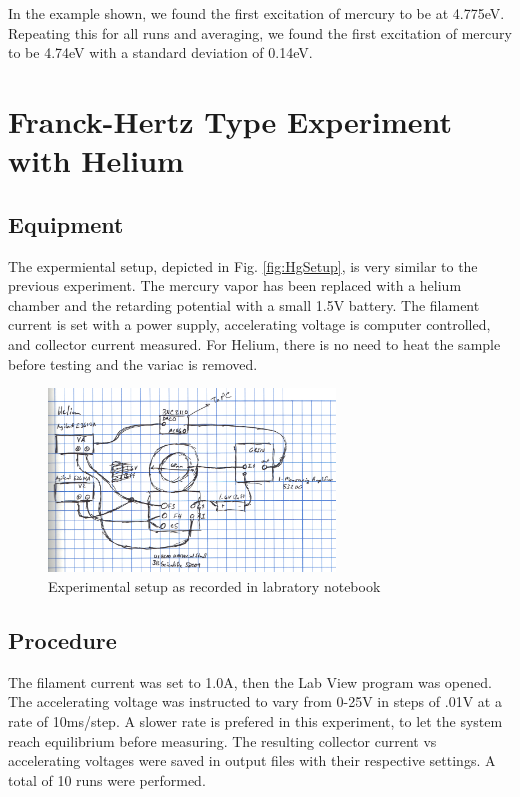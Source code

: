\documentclass[12pt,twocolumn]{article}
\begin{document}
In the example shown, we found the first excitation of mercury to be at 4.775eV. Repeating this for all runs and averaging, we found the first excitation of mercury to be 4.74eV with a standard deviation of 0.14eV.


\section{Franck-Hertz Type Experiment with Helium}

\subsection{Equipment}


The expermiental setup, depicted in Fig. \ref{fig:HgSetup}, is very similar to the previous experiment. The mercury vapor has been replaced with a helium chamber and the retarding potential with a small 1.5V battery. The filament current is set with a power supply, accelerating voltage is computer controlled, and collector current measured. For Helium, there is no need to heat the sample before testing and the variac is removed.

\begin{figure}[h!]
	\centering
	\includegraphics[width=3in]{images/HeliumSetup}
	\caption{Experimental setup as recorded in labratory notebook}
	\label{fig:HeSetup}
\end{figure}

\subsection{Procedure}

The filament current was set to 1.0A, then the Lab View program was opened. The accelerating voltage was instructed to vary from 0-25V in steps of .01V at a rate of 10ms/step. A slower rate is prefered in this experiment, to let the system reach equilibrium before measuring. The resulting collector current vs accelerating voltages were saved in output files with their respective settings. A total of 10 runs were performed.
\end{document}
